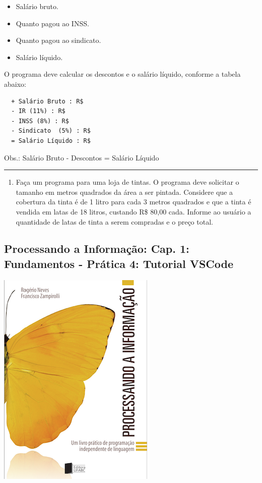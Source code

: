 \documentclass[12pt,a4paper]{article}
\renewcommand{\linethickness}{0.05em}
\providecommand{\tightlist}{%
      \setlength{\itemsep}{0pt}\setlength{\parskip}{0pt}}
\begin{document}
\begin{itemize}
\tightlist
\item
  Salário bruto.
\item
  Quanto pagou ao INSS.
\item
  Quanto pagou ao sindicato.
\item
  Salário líquido.
\end{itemize}

O programa deve calcular os descontos e o salário líquido, conforme a
tabela abaixo:

\begin{verbatim}
  + Salário Bruto : R$
  - IR (11%) : R$
  - INSS (8%) : R$
  - Sindicato  (5%) : R$
  = Salário Líquido : R$
\end{verbatim}

Obs.: Salário Bruto - Descontos = Salário Líquido

    \begin{center}\rule{0.5\linewidth}{\linethickness}\end{center}

\begin{enumerate}
\def\labelenumi{\arabic{enumi}.}
\setcounter{enumi}{9}
\tightlist
\item
  Faça um programa para uma loja de tintas. O programa deve solicitar o
  tamanho em metros quadrados da área a ser pintada. Considere que a
  cobertura da tinta é de 1 litro para cada 3 metros quadrados e que a
  tinta é vendida em latas de 18 litros, custando R\$ 80,00 cada.
  Informe ao usuário a quantidade de latas de tinta a serem compradas e
  o preço total.
\end{enumerate}

    \hypertarget{processando-a-informauxe7uxe3o-cap.-1-fundamentos---pruxe1tica-4-tutorial-vscode}{%
\subsection{Processando a Informação: Cap. 1: Fundamentos - Prática 4:
Tutorial
VSCode}\label{processando-a-informauxe7uxe3o-cap.-1-fundamentos---pruxe1tica-4-tutorial-vscode}}

    \includegraphics{"figs/Capa_Processando_Informacao.jpg"}
\end{document}
